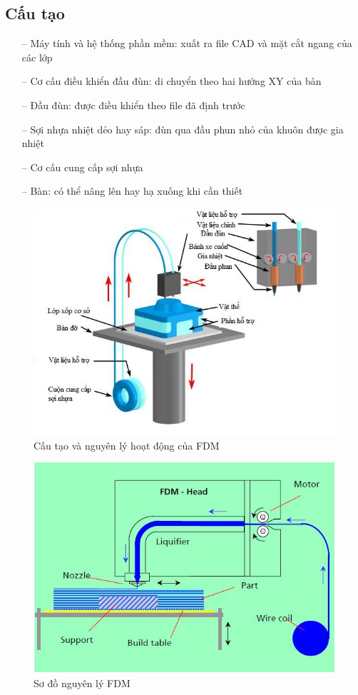 \subsection{Cấu tạo}
\begin{itemize}
\item[--] Máy tính và hệ thống phần mềm: xuất ra file CAD và mặt cắt ngang của các lớp
\item[--] Cơ cấu điều khiển đầu đùn: di chuyển theo hai hướng XY của bàn
\item[--] Đầu đùn: được điều khiển theo file đã định trước
\item[--] Sợi nhựa nhiệt dẻo hay sáp: đùn qua đầu phun nhỏ của khuôn được gia nhiệt
\item[--] Cơ cấu cung cấp sợi nhựa
\item[--] Bàn: có thể nâng lên hay hạ xuống khi cần thiết
\end{itemize}

\begin{figure}[ht]
\centering
\includegraphics[scale=0.5]{images/nguyen-ly-fdm.jpg}
\caption{Cấu tạo và nguyên lý hoạt động của FDM}
\end{figure}

\begin{figure}[ht]
\centering
\includegraphics[scale=0.5]{images/so-do-nguyen-ly-fdm.jpg}
\caption{Sơ đồ nguyên lý FDM}
\end{figure}

